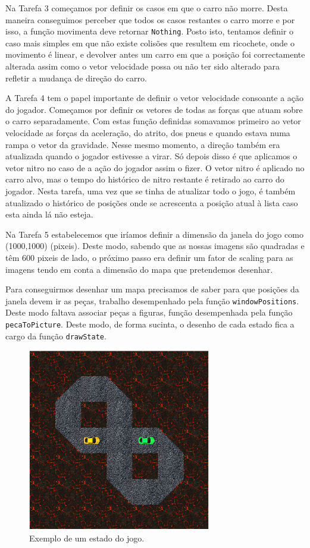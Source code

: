 \documentclass[a4paper]{report}
\begin{document}
Na Tarefa 3 começamos por definir os casos em que o carro não morre. Desta
maneira conseguimos perceber que todos os casos restantes o carro morre e por
isso, a função movimenta deve retornar \texttt{Nothing}. Posto isto, tentamos
definir o caso mais simples em que não existe colisões que resultem em
ricochete, onde o movimento é linear, e devolver antes um carro em que a posição
foi correctamente alterada assim como o vetor velocidade possa ou não ter sido
alterado para refletir a mudança de direção do carro.

A Tarefa 4 tem o papel importante de definir o vetor velocidade consoante a ação
do jogador. Começamos por definir os vetores de todas as forças que atuam sobre
o carro separadamente. Com estas função definidas somavamos primeiro ao vetor
velocidade as forças da aceleração, do atrito, dos pneus e quando estava numa
rampa o vetor da gravidade. Nesse mesmo momento, a direção também era atualizada
quando o jogador estivesse a virar. Só depois disso é que aplicamos o vetor
nitro no caso de a ação do jogador assim o fizer. O vetor nitro é aplicado no
carro alvo, mas o tempo do histórico de nitro restante é retirado ao carro do
jogador. Nesta tarefa, uma vez que se tinha de atualizar todo o jogo, é também
atualizado o histórico de posições onde se acrescenta a posição atual à lista
caso esta ainda lá não esteja.

Na Tarefa 5 estabelecemos que iríamos definir a dimensão da janela do jogo como
(1000,1000) (pixeis). Deste modo, sabendo que as nossas imagens são quadradas e
têm 600 pixeis de lado, o próximo passo era definir um fator de scaling para as
imagens tendo em conta a dimensão do mapa que pretendemos desenhar.

Para conseguirmos desenhar um mapa precisamos de saber para que posições da
janela devem ir as peças, trabalho desempenhado pela função
\texttt{windowPositions}. Deste modo faltava associar peças a figuras, função
desempenhada pela função \texttt{pecaToPicture}. Deste modo, de forma sucinta, o
desenho de cada estado fica a cargo da função \texttt{drawState}.

\begin{figure}[h]
\label{fig:estado}
\centering
\includegraphics[width=8cm]{exemplo-mapa}
\caption{Exemplo de um estado do jogo.}
\end{figure}
\end{document}
